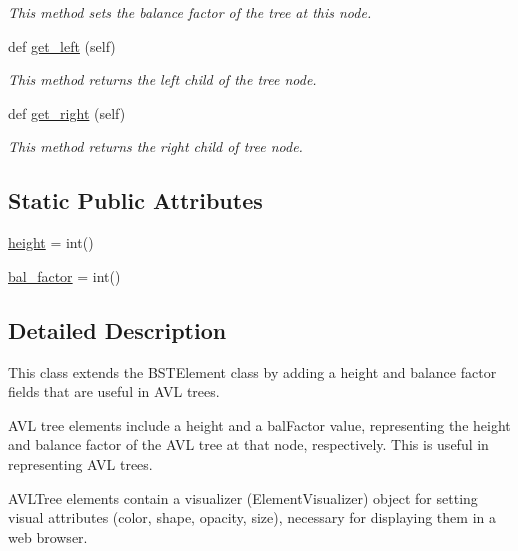 \begin{DoxyCompactItemize}
\begin{DoxyCompactList}\small\item\em This method sets the balance factor of the tree at this node. \end{DoxyCompactList}\item 
def \mbox{\hyperlink{class_bridges_1_1avl__tree__element_1_1_a_v_l_tree_element_af534fdbf8ec5fe48aaf02ef9b8537b81}{get\+\_\+left}} (self)
\begin{DoxyCompactList}\small\item\em This method returns the left child of the tree node. \end{DoxyCompactList}\item 
def \mbox{\hyperlink{class_bridges_1_1avl__tree__element_1_1_a_v_l_tree_element_afc0e1b61a4e6e07192234d0975daaa9c}{get\+\_\+right}} (self)
\begin{DoxyCompactList}\small\item\em This method returns the right child of tree node. \end{DoxyCompactList}\end{DoxyCompactItemize}
\subsection*{Static Public Attributes}
\begin{DoxyCompactItemize}
\item 
\mbox{\hyperlink{class_bridges_1_1avl__tree__element_1_1_a_v_l_tree_element_ad4e11b61cca78051aea548c7fcb4e4fb}{height}} = int()
\item 
\mbox{\hyperlink{class_bridges_1_1avl__tree__element_1_1_a_v_l_tree_element_a9187ba8eeedf0e359f020b443275c356}{bal\+\_\+factor}} = int()
\end{DoxyCompactItemize}


\subsection{Detailed Description}
This class extends the B\+S\+T\+Element class by adding a height and balance factor fields that are useful in A\+VL trees. 

A\+VL tree elements include a \textquotesingle{}height\textquotesingle{} and a \textquotesingle{}bal\+Factor\textquotesingle{} value, representing the height and balance factor of the A\+VL tree at that node, respectively. This is useful in representing A\+VL trees.

A\+V\+L\+Tree elements contain a visualizer (Element\+Visualizer) object for setting visual attributes (color, shape, opacity, size), necessary for displaying them in a web browser.

